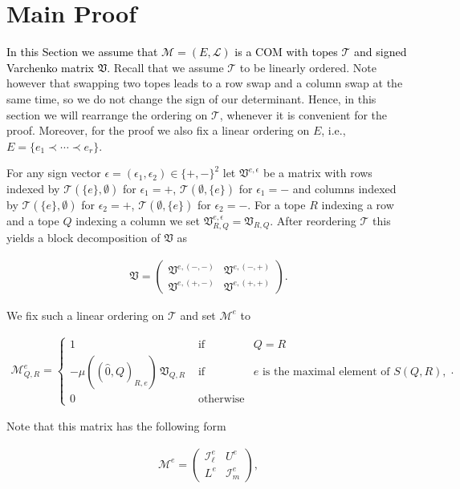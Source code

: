 \documentclass[12pt]{amsart}
\def\Var{{\mathfrak V}}
\def\Tscr{{\mathcal T}}
\def\M{{\mathcal M}}
\theoremstyle{plain}
\numberwithin{Lemma}{\DefaultNumberTheoremWithin}
\numberwithin{Claim}{\DefaultNumberTheoremWithin}
\numberwithin{Theorem}{\DefaultNumberTheoremWithin}
\numberwithin{Corollary}{\DefaultNumberTheoremWithin}
\numberwithin{Proposition}{\DefaultNumberTheoremWithin}
\numberwithin{Conjecture}{\DefaultNumberTheoremWithin}
\numberwithin{Situation}{\DefaultNumberTheoremWithin}
\numberwithin{Note}{\DefaultNumberTheoremWithin}
\theoremstyle{definition}
\numberwithin{Definition}{\DefaultNumberTheoremWithin}
\theoremstyle{definition}
\numberwithin{Question}{\DefaultNumberTheoremWithin}
\theoremstyle{definition}
\numberwithin{Problem}{\DefaultNumberTheoremWithin}
\theoremstyle{remark} \newtheorem{Remark}{Remark}
\numberwithin{Remark}{\DefaultNumberTheoremWithin}
\theoremstyle{remark}
\numberwithin{Example}{\DefaultNumberTheoremWithin}
\numberwithin{Case}{Lemma}
\numberwithin{Step}{Lemma}
\newcommand{\new}[1]{\textcolor{black}{#1}}
\begin{document}
\section{Main Proof}\label{sec:4}
\new{In this Section we assume that $\M=(E,\mathcal{L})$ is a COM with topes $\Tscr$ and signed Varchenko matrix $\Var$.} Recall that we assume $\Tscr$ to be linearly ordered. Note however that swapping two topes leads to a row swap and a column swap at the same time, so we do not change the sign of our determinant. Hence, in this section we will rearrange the ordering on $\Tscr$, whenever it is convenient for the proof. Moreover, for the proof we also fix a linear ordering on $E$, i.e., $E = \{ e_1 \prec \cdots \prec e_r\}$.

For any sign vector $\epsilon =
(\epsilon_1,\epsilon_2) \in \{ +,-\}^2$ let $\Var^{e,\epsilon}$
be a matrix with rows indexed by $\Tscr(\{e\} ,\emptyset)$ for $\epsilon_1 =+$,
$\Tscr(\emptyset, \{e\})$ for $\epsilon_1 = -$ and columns indexed
by $\Tscr(\{e\},\emptyset)$ for $\epsilon_2 = +$, $\Tscr(\emptyset, \{e\})$ for
$\epsilon_2 = -$. For a tope $R$ indexing a row and
a tope $Q$ indexing a column we set $\Var^{e,\epsilon}_{R,Q} = \Var_{R,Q}$. After reordering $\Tscr$ this yields a block decomposition of $\Var$ as

\begin{align}\label{equ:blocks}
\Var = \left( 
       \begin{array}{cc} 
         \Var^{e,(-,-)} & \Var^{e,(-,+)}    \\ 
         \Var^{e,(+,-)} & \Var^{e,(+,+)}  
       \end{array}
      \right) .
\end{align}

We fix such a linear ordering on $\Tscr$ and set $\mathcal{M}^e$ to 

\begin{align*}
\mathcal{M}^e_{Q,R} = \left\{ 
	    \begin{array}{ccc} 
		1 & \mbox{~if~} & Q = R \\ 
	       -\mu((\hat{0},Q)_{R,e})\, \Var_{Q,R} & \mbox{~if~} & e \text{ is the maximal element of }S(Q,R),  \\
		0 & \mbox{~otherwise} & 
	    \end{array} \right. . 
\end{align*}
	  
Note that this matrix has the following form

\begin{align*}
\mathcal{M}^e = 
      \left(  \begin{array}{cc} 
         \mathcal{I}^e_{\ell}  & U^e  \\ 
         L^e  & \mathcal{I}^e_{m} 
       \end{array}
      \right) ,
\end{align*}
      
\end{document}
